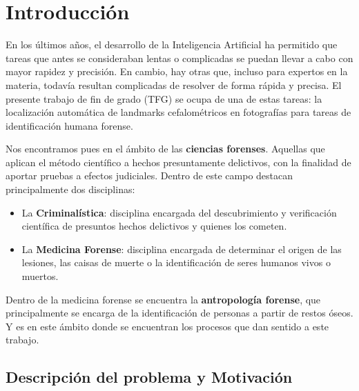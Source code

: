 
\chapter{Introducción}  \label{ch:Introduccion_informatica}

\noindent En los últimos años, el desarrollo de la Inteligencia Artificial \cite{norvig2002modern} ha permitido que tareas que antes se consideraban lentas o complicadas se puedan llevar a cabo con mayor rapidez y precisión. En cambio, hay otras que, incluso para expertos en la materia, todavía resultan complicadas de resolver de forma rápida y precisa. El presente trabajo de fin de grado (TFG) se ocupa de una de estas tareas: la localización automática de landmarks cefalométricos en fotografías para tareas de identificación humana forense. 

\medskip

\noindent Nos encontramos pues en el ámbito de las \textbf{ciencias forenses}. Aquellas que aplican el método científico a hechos presuntamente delictivos, con la finalidad de aportar pruebas a efectos judiciales. Dentro de este campo destacan principalmente dos disciplinas: 

\begin{itemize}
    \item La \textbf{Criminalística}: disciplina encargada del descubrimiento y verificación científica de presuntos hechos delictivos y quienes los cometen.
    \item La \textbf{Medicina Forense}: disciplina encargada de determinar el origen de las lesiones, las caisas de muerte o la identificación de seres humanos vivos o muertos.
\end{itemize}

\medskip

\noindent Dentro de la medicina forense se encuentra la \textbf{antropología forense}, que principalmente se encarga de la identificación de personas a partir de restos óseos. Y es en este ámbito donde se encuentran los procesos que dan sentido a este trabajo. 


\section{Descripción del problema y Motivación}

